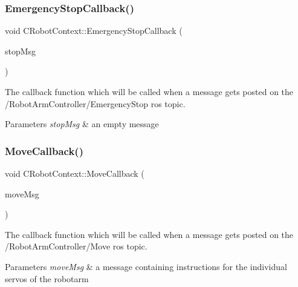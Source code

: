 \subsubsection{\texorpdfstring{Emergency\+Stop\+Callback()}{EmergencyStopCallback()}}
{\footnotesize\ttfamily void C\+Robot\+Context\+::\+Emergency\+Stop\+Callback (\begin{DoxyParamCaption}\item[{const Robot\+Arm\+Controller\+::\+Emergency\+Stop\+::\+Const\+Ptr \&}]{stop\+Msg }\end{DoxyParamCaption})}



The callback function which will be called when a message gets posted on the /\+Robot\+Arm\+Controller/\+Emergency\+Stop ros topic. 


\begin{DoxyParams}{Parameters}
{\em stop\+Msg} & an empty message \\
\hline
\end{DoxyParams}
\mbox{\label{classCRobotContext_a0c691e094641e2e424dce4505a5db275}} 
\subsubsection{\texorpdfstring{Move\+Callback()}{MoveCallback()}}
{\footnotesize\ttfamily void C\+Robot\+Context\+::\+Move\+Callback (\begin{DoxyParamCaption}\item[{const Robot\+Arm\+Controller\+::\+Move\+::\+Const\+Ptr \&}]{move\+Msg }\end{DoxyParamCaption})}



The callback function which will be called when a message gets posted on the /\+Robot\+Arm\+Controller/\+Move ros topic. 


\begin{DoxyParams}{Parameters}
{\em move\+Msg} & a message containing instructions for the individual servos of the robotarm \\
\hline
\end{DoxyParams}
\mbox{\label{classCRobotContext_a9ab9301b43253d237984667c1b586cec}} 
